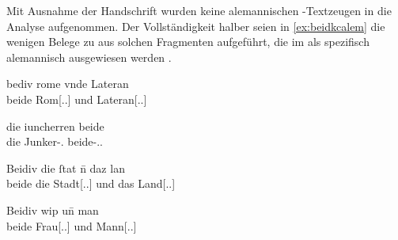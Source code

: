 Mit Ausnahme der Handschrift \citet{kc:K} wurden keine alemannischen
\KC{}-Textzeugen in die Analyse aufgenommen. Der Vollständigkeit halber
seien in \cref{ex:beidkcalem} die wenigen Belege zu  aus solchen
Fragmenten aufgeführt, die im \citet{hsc} als spezifisch alemannisch
ausgewiesen werden \autocite[vgl.][4, 44, 54]{wolf:kckat}.

\begin{exe}
\ex \label{ex:beidkcalem}
	\begin{xlist}
	\ex \gll bediv rome vnde Lateran \\ %
		     beide Rom[\Acc.\Sg.\NeutI] und Lateran[\Acc.\Sg.\MascI] \\
		\begin{taggedline}{\parencites[\pno~2\vb, 17]{kc:a11}[vgl.][5953]{schroeder1895}}
		\trans {}
		\end{taggedline}

	\ex \gll die iuncherren beide \\ %
		     die Junker-\Nom.\Pl{} beide-\Nom.\Pl.\MascM{} \\
		\begin{taggedline}{\parencites[\pno~1\vb, 14]{kc:a14}[vgl.][1417]{schroeder1895}}
		\trans {}
		\end{taggedline}

	\ex \gll Beidiv die ſtat n̄ daz lan \\ %
		     beide die Stadt[\Acc.\Sg.\FemI] und das Land[\Acc.\Sg.\NeutI] \\
		\begin{taggedline}{\parencite[\pno~1\rb, 4]{kc:b1}}
		\trans {}
		\end{taggedline}

	\ex \gll Beidiv wip un̄ man \\ %
		     beide Frau[\Nom.\Sg.\NeutF] und Mann[\Nom.\Sg.\MascM] \\
		\begin{taggedline}{\parencites[\pno~2\rb, 29]{kc:b1}[vgl.][619]{schroeder1895}}
		\trans {}
		\end{taggedline}
\end{xlist}
\end{exe}
